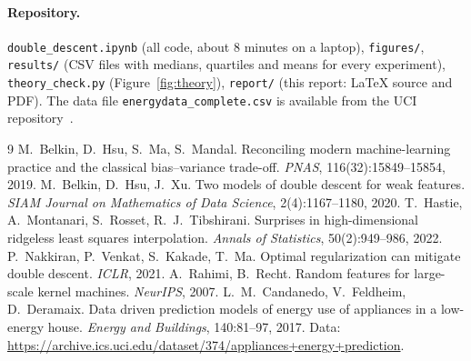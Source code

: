 \documentclass[10pt,a4paper]{article}
\begin{document}
\paragraph{Repository.} \texttt{double\_descent.ipynb} (all code, about 8 minutes on a laptop), \texttt{figures/}, \texttt{results/} (CSV files with medians, quartiles and means for every experiment), \texttt{theory\_check.py} (Figure~\ref{fig:theory}), \texttt{report/} (this report: \LaTeX{} source and PDF). The data file \texttt{energydata\_complete.csv} is available from the UCI repository~\cite{candanedo2017}.

\begin{thebibliography}{9}\small
{} M.~Belkin, D.~Hsu, S.~Ma, S.~Mandal. Reconciling modern machine-learning practice and the classical bias--variance trade-off. \emph{PNAS}, 116(32):15849--15854, 2019.
 M.~Belkin, D.~Hsu, J.~Xu. Two models of double descent for weak features. \emph{SIAM Journal on Mathematics of Data Science}, 2(4):1167--1180, 2020.
 T.~Hastie, A.~Montanari, S.~Rosset, R.~J.~Tibshirani. Surprises in high-dimensional ridgeless least squares interpolation. \emph{Annals of Statistics}, 50(2):949--986, 2022.
 P.~Nakkiran, P.~Venkat, S.~Kakade, T.~Ma. Optimal regularization can mitigate double descent. \emph{ICLR}, 2021.
 A.~Rahimi, B.~Recht. Random features for large-scale kernel machines. \emph{NeurIPS}, 2007.
 L.~M.~Candanedo, V.~Feldheim, D.~Deramaix. Data driven prediction models of energy use of appliances in a low-energy house. \emph{Energy and Buildings}, 140:81--97, 2017. Data: \url{https://archive.ics.uci.edu/dataset/374/appliances+energy+prediction}.
\end{thebibliography}
\end{document}

